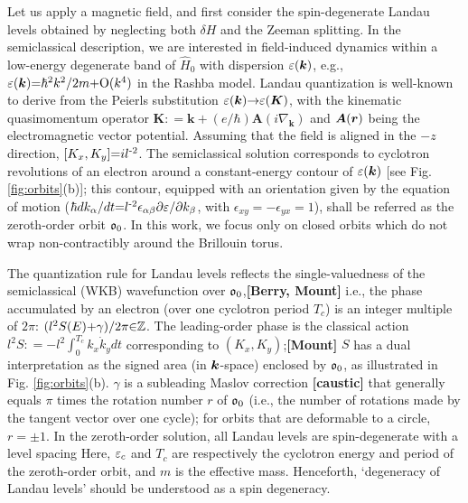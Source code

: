 \documentclass[aps, prb, showpacs, twocolumn, notitlepage, superscriptaddress]{revtex4-1}
\begin{document}
Let us apply a magnetic field, and first consider the spin-degenerate Landau levels obtained by neglecting both $\delta H$ and the Zeeman splitting. In the  semiclassical description,  we are interested in  field-induced dynamics within a low-energy degenerate band of $\hat{H}_0$ with  dispersion $\varepsilon(\boldsymbol{k})$, e.g., $\varepsilon(\boldsymbol{k}){=}\hbar^2 k^2/2m{+}\text{O}(k^4)$ in the Rashba model.    Landau quantization is well-known to derive from the Peierls substitution $\varepsilon(\boldsymbol{k}){\rightarrow}\varepsilon(\boldsymbol{K})$\cite{peierls_substitution}, with the kinematic quasimomentum operator   $\boldsymbol{K}{:}{=}\boldsymbol{k}{+}(e/\hbar) \boldsymbol{A}(i\nabla_{\boldsymbol{k}})$ and $\boldsymbol{A}(\boldsymbol{r})$ being the electromagnetic vector potential. Assuming that the field is aligned in the ${-}z$ direction, $[K_x,K_y]{=}il^{\text{-}2}$. The semiclassical solution corresponds to  cyclotron revolutions of an electron around a constant-energy contour of $\varepsilon(\boldsymbol{k})$ [see Fig. \ref{fig:orbits}(b)]; this contour, equipped with an orientation given by the equation of motion ($ \hbar dk_{\alpha}/dt {=} l^{\text{-}2} \epsilon_{\alpha\beta}\partial \varepsilon/\partial k_{\beta} $, with $\epsilon_{xy}{=}{-}\epsilon_{yx}{=}1$), shall be referred as the zeroth-order orbit $\mathfrak{o}_0$.  In this work, we focus only on closed orbits which do not wrap 
non-contractibly around the Brillouin torus.



The quantization rule for Landau levels reflects the single-valuedness of the semiclassical (WKB) wavefunction over $\mathfrak{o}_0$,\textbf{[Berry, Mount]} i.e.,  the phase accumulated by an electron (over one cyclotron period $T_c$) is an integer multiple of $2\pi$: $(l^2S(E){+}\gamma)/2\pi{\in}\mathbb{Z}$. The leading-order phase   is the classical action $l^2S{:}{=}{-}l^2\int_{0}^{T_c} k_x \dot{k}_y dt$  corresponding to $(K_x,K_y)$;\textbf{[Mount]} $S$ has a dual interpretation as the signed area (in $\boldsymbol{k}$-space) enclosed by $\mathfrak{o}_0$, as illustrated in Fig. \ref{fig:orbits}(b). $\gamma$ is a subleading Maslov correction \textbf{[caustic]} that generally equals $\pi$ times the rotation number $r$ of $\mathfrak{o}_0$ (i.e., the number of rotations made by the tangent vector over one cycle)\cite{100p}; for orbits that are deformable to a circle,  $r{=}{\pm} 1$. In the zeroth-order  solution, all Landau levels are spin-degenerate with a level spacing 
Here, $\varepsilon_c$ and $T_c$ are respectively the cyclotron energy and period of the zeroth-order orbit, and $m$ is the effective mass. Henceforth, `degeneracy of Landau levels' should be understood as a spin degeneracy. 
\end{document}
